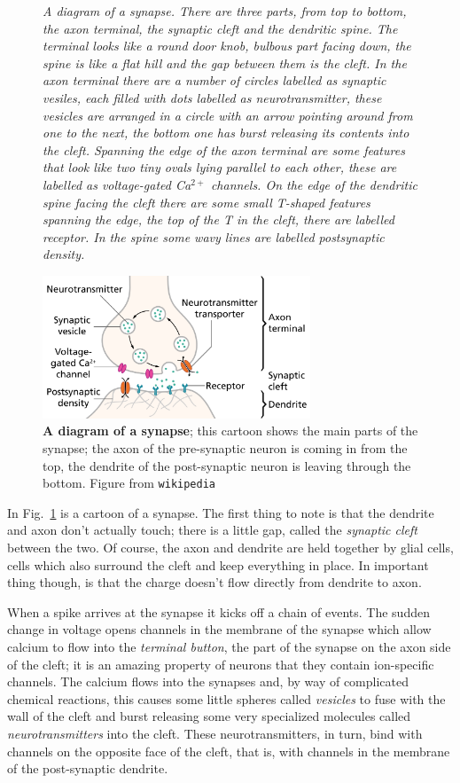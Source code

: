 \documentclass[12pt]{article}
\begin{document}
\begin{figure}[tbhp]
           {\textsl{A diagram of a synapse. There are three parts, from top to bottom, the axon terminal, the synaptic cleft and the dendritic spine. The terminal looks like a round door knob, bulbous part facing down, the spine is like a flat hill and the gap between them is the cleft. In the axon terminal there are a number of circles labelled as synaptic vesiles, each filled with dots labelled as neurotransmitter, these vesicles are arranged in a circle with an arrow pointing around from one to the next, the bottom one has burst releasing its contents into the cleft. Spanning the edge of the axon terminal are some features that look like two tiny ovals lying parallel to each other, these are labelled as voltage-gated Ca$^{2+}$ channels. On the edge of the dendritic spine facing the cleft there are some small T-shaped features spanning the edge, the top of the T in the cleft, there are labelled receptor. In the spine some wavy lines are labelled  postsynaptic density.}}
{
  \begin{center}
    \includegraphics[width=8cm]{synapse.png}
  \end{center}
  }
  \caption{\textbf{A diagram of a synapse}; this cartoon shows the
    main parts of the synapse; the axon of the pre-synaptic neuron is
    coming in from the top, the dendrite of the post-synaptic neuron
    is leaving through the bottom. Figure from
    \texttt{wikipedia}\label{fig_synapse}}
\end{figure}

In Fig.~\ref{fig_synapse} is a cartoon of a synapse. The first thing
to note is that the dendrite and axon don't actually touch; there is a
little gap, called the \textsl{synaptic cleft} between the two. Of
course, the axon and dendrite are held together by glial cells, cells
which also surround the cleft and keep everything in place. In
important thing though, is that the charge doesn't flow directly from dendrite to axon.

When a spike arrives at the synapse it kicks off a chain of
events. The sudden change in voltage opens channels in the membrane of
the synapse which allow calcium to flow into the \textsl{terminal button}, the part of the synapse on the axon side of the cleft; it is an
amazing property of neurons that they contain ion-specific
channels. The calcium flows into the synapses and, by way of
complicated chemical reactions, this causes some little spheres called
\textsl{vesicles} to fuse with the wall of the cleft and burst
releasing some very specialized molecules called
\textsl{neurotransmitters} into the cleft. These neurotransmitters, in
turn, bind with channels on the opposite face of the cleft, that is,
with channels in the membrane of the post-synaptic dendrite.
\end{document}

